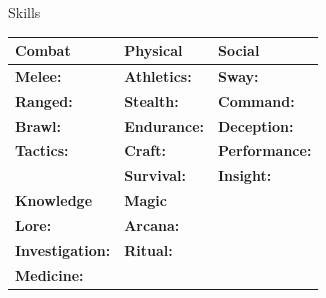 \documentclass[10pt]{article}
\begin{document}
\begin{minipage}[t]{0.48\linewidth}
    \vspace{0.5em}
    
    \begin{charbox}{Skills}
        \begin{tabular}{>{\bfseries}p{3cm} >{\bfseries}p{3cm} >{\bfseries}p{3cm}}
            \toprule
            \textbf{Combat} & \textbf{Physical} & \textbf{Social} \\
            \midrule
            Melee: \underline{\hspace{1.5cm}} & Athletics: \underline{\hspace{1.5cm}} & Sway: \underline{\hspace{1.5cm}} \\
            Ranged: \underline{\hspace{1.5cm}} & Stealth: \underline{\hspace{1.5cm}} & Command: \underline{\hspace{1.5cm}} \\
            Brawl: \underline{\hspace{1.5cm}} & Endurance: \underline{\hspace{1.5cm}} & Deception: \underline{\hspace{1.5cm}} \\
            Tactics: \underline{\hspace{1.5cm}} & Craft: \underline{\hspace{1.5cm}} & Performance: \underline{\hspace{1.5cm}} \\
            & Survival: \underline{\hspace{1.5cm}} & Insight: \underline{\hspace{1.5cm}} \\
            \addlinespace
            \textbf{Knowledge} & \textbf{Magic} & \\
            Lore: \underline{\hspace{1.5cm}} & Arcana: \underline{\hspace{1.5cm}} & \\
            Investigation: \underline{\hspace{1.5cm}} & Ritual: \underline{\hspace{1.5cm}} & \\
            Medicine: \underline{\hspace{1.5cm}} & & \\
            \bottomrule
        \end{tabular}
    \end{charbox}
\end{minipage}
\end{document}
